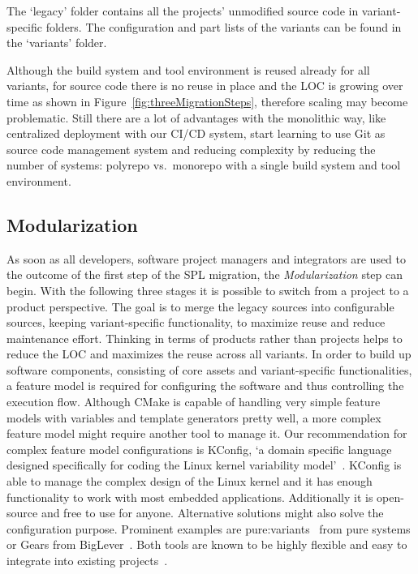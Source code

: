 The `legacy' folder contains all the projects' unmodified source code in
variant-specific folders. The configuration and part lists of the variants can
be found in the `variants' folder.

Although the build system and tool environment is reused already for all
variants, for source code there is no reuse in place and the LOC is growing over
time as shown in Figure~\ref{fig:threeMigrationSteps}, therefore scaling may
become problematic. Still there are a lot of advantages with the monolithic way,
like centralized deployment with our CI/CD system, start learning to use Git as
source code management system and reducing complexity by reducing the number of
systems: polyrepo vs.\ monorepo with a single build system and tool environment.

\subsection{Modularization}\label{modularization}

As soon as all developers, software project managers and integrators are used to
the outcome of the first step of the SPL migration, the \textit{Modularization}
step can begin. With the following three stages it is possible to switch from a
project to a product perspective. The goal is to merge the legacy sources into
configurable sources, keeping variant-specific functionality, to maximize reuse
and reduce maintenance effort. Thinking in terms of products rather than
projects helps to reduce the LOC and maximizes the reuse across all variants. In
order to build up software components, consisting of core assets and
variant-specific functionalities, a feature model is required for configuring
the software and thus controlling the execution flow.  Although CMake is capable
of handling very simple feature models with variables and template generators
pretty well, a more complex feature model might require another tool to manage
it. Our recommendation for complex feature model configurations is KConfig, `a
domain specific language designed specifically for coding the Linux kernel
variability model'~\cite[page 3]{kconfigKernel}. KConfig is able to manage the
complex design of the Linux kernel and it has enough functionality to work with
most embedded applications. Additionally it is open-source and free to use for
anyone. Alternative solutions might also solve the configuration purpose.
Prominent examples are pure:variants~\cite{pureVariantsPureSystems} from pure
systems or Gears from BigLever~\cite{gearsBigLever}. Both tools are known to be
highly flexible and easy to integrate into existing
projects~\cite{confsplcGrunerBKR20}.

